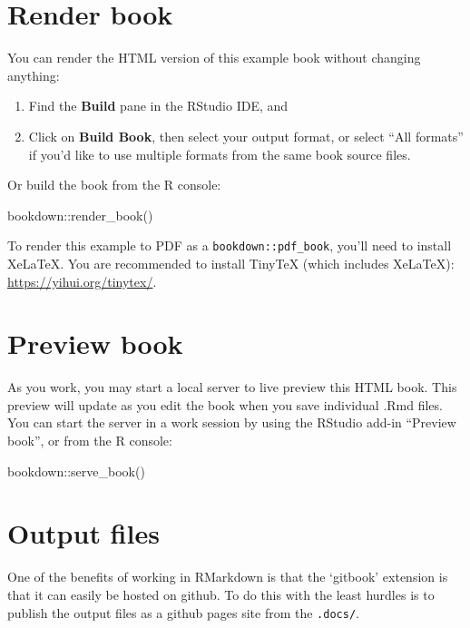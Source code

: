 \documentclass[
]{book}
\newenvironment{Shaded}{\begin{snugshade}}{\end{snugshade}}
\newcommand{\FunctionTok}[1]{\textcolor[rgb]{0.00,0.00,0.00}{#1}}
\newcommand{\NormalTok}[1]{#1}
\newcommand{\SpecialCharTok}[1]{\textcolor[rgb]{0.00,0.00,0.00}{#1}}
\begin{document}
\hypertarget{render-book}{%
\section{Render book}\label{render-book}}

You can render the HTML version of this example book without changing anything:

\begin{enumerate}
\def\labelenumi{\arabic{enumi}.}
\item
  Find the \textbf{Build} pane in the RStudio IDE, and
\item
  Click on \textbf{Build Book}, then select your output format, or select ``All formats'' if you'd like to use multiple formats from the same book source files.
\end{enumerate}

Or build the book from the R console:

\begin{Shaded}
\begin{Highlighting}[]
\NormalTok{bookdown}\SpecialCharTok{::}\FunctionTok{render\_book}\NormalTok{()}
\end{Highlighting}
\end{Shaded}

To render this example to PDF as a \texttt{bookdown::pdf\_book}, you'll need to install XeLaTeX. You are recommended to install TinyTeX (which includes XeLaTeX): \url{https://yihui.org/tinytex/}.

\hypertarget{preview-book}{%
\section{Preview book}\label{preview-book}}

As you work, you may start a local server to live preview this HTML book. This preview will update as you edit the book when you save individual .Rmd files. You can start the server in a work session by using the RStudio add-in ``Preview book'', or from the R console:

\begin{Shaded}
\begin{Highlighting}[]
\NormalTok{bookdown}\SpecialCharTok{::}\FunctionTok{serve\_book}\NormalTok{()}
\end{Highlighting}
\end{Shaded}

\hypertarget{output-files}{%
\section{Output files}\label{output-files}}

One of the benefits of working in RMarkdown is that the `gitbook' extension is that it can easily be hosted on github. To do this with the least hurdles is to publish the output files as a github pages site from the \texttt{.docs/}.

  
\end{document}

